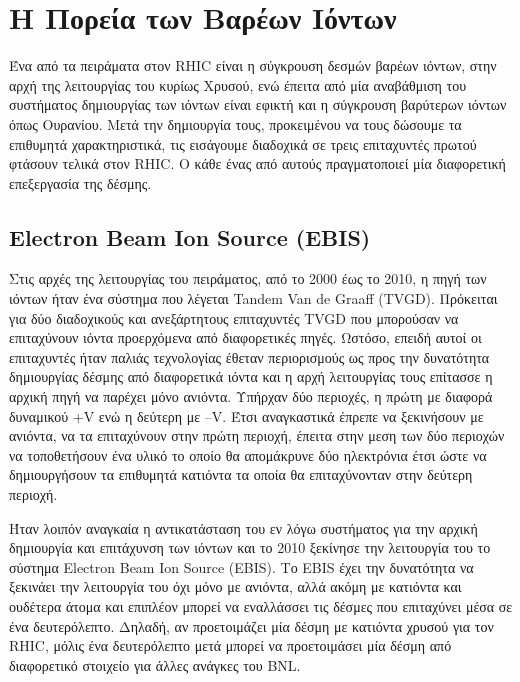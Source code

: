 	\section{Η Πορεία των Βαρέων Ιόντων}
	Ένα από τα πειράματα στον RHIC είναι η σύγκρουση δεσμών βαρέων ιόντων, στην αρχή της λειτουργίας του κυρίως Χρυσού, ενώ έπειτα από μία αναβάθμιση του συστήματος δημιουργίας των ιόντων είναι εφικτή και η σύγκρουση βαρύτερων ιόντων όπως Ουρανίου. Μετά την δημιουργία τους, προκειμένου να τους δώσουμε τα επιθυμητά χαρακτηριστικά, τις εισάγουμε διαδοχικά σε τρεις επιταχυντές πρωτού φτάσουν τελικά στον RHIC. Ο κάθε ένας από αυτούς πραγματοποιεί μία διαφορετική επεξεργασία της δέσμης.
	
	\subsection{Electron Beam Ion Source (EBIS)}
	Στις αρχές της λειτουργίας του πειράματος, από το 2000 έως το 2010, η πηγή των ιόντων ήταν ένα σύστημα που λέγεται Tandem Van de Graaff (TVGD). Πρόκειται για δύο διαδοχικούς και ανεξάρτητους επιταχυντές TVGD που μπορούσαν να επιταχύνουν ιόντα προερχόμενα από διαφορετικές πηγές. 
	Ωστόσο, επειδή αυτοί οι επιταχυντές ήταν παλιάς τεχνολογίας έθεταν περιορισμούς ως προς την δυνατότητα δημιουργίας δέσμης από διαφορετικά ιόντα και η αρχή λειτουργίας τους επίτασσε η αρχική πηγή να παρέχει μόνο ανιόντα. Υπήρχαν δύο περιοχές, η πρώτη με διαφορά δυναμικού +V ενώ η δεύτερη με –V. 
	Έτσι αναγκαστικά έπρεπε να ξεκινήσουν με ανιόντα, να τα επιταχύνουν στην πρώτη περιοχή, έπειτα στην μεση των δύο περιοχών να τοποθετήσουν ένα υλικό το οποίο θα απομάκρυνε δύο ηλεκτρόνια έτσι ώστε να δημιουργήσουν τα επιθυμητά κατιόντα τα οποία θα επιταχύνονταν στην δεύτερη περιοχή.
	
	Ήταν λοιπόν αναγκαία η αντικατάσταση του εν λόγω συστήματος για την αρχική δημιουργία και επιτάχυνση των ιόντων  και το 2010 ξεκίνησε την λειτουργία του το σύστημα Electron Beam Ion Source (EBIS). Το EBIS έχει την δυνατότητα να ξεκινάει την λειτουργία του όχι μόνο με ανιόντα, αλλά ακόμη με κατιόντα και ουδέτερα άτομα και επιπλέον μπορεί να εναλλάσσει τις δέσμες που επιταχύνει μέσα σε ένα δευτερόλεπτο. Δηλαδή, αν προετοιμάζει μία δέσμη με κατιόντα χρυσού για τον RHIC, μόλις ένα δευτερόλεπτο μετά μπορεί να προετοιμάσει μία δέσμη από διαφορετικό στοιχείο για άλλες ανάγκες του BNL. 
	
